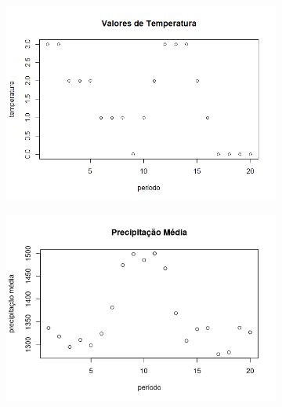 \documentclass{article}
\begin{document}
				\begin{figure}
 					 \begin{subfigure}[b]{0.6\textwidth}
   						 \includegraphics[width=\textwidth]{plotTemp}
 					 \end{subfigure}
 					 \begin{subfigure}[b]{0.6\textwidth}
   						 \includegraphics[width=\textwidth]{precMedia}
 					 \end{subfigure}
 				\end{figure}
 				
\end{document}
